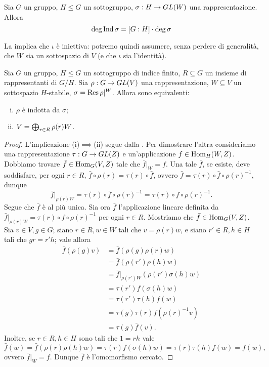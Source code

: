 \begin{corollary}
Sia $G$ un gruppo, $H\le G$ un sottogruppo, $\sigma:H\to GL(W)$ una rappresentazione. Allora
$$
\deg\operatorname{Ind}\sigma=[G:H]\cdot\deg\sigma
$$
\end{corollary}

La  implica che $\iota$ è iniettiva: potremo quindi assumere, senza perdere di generalità, che $W$ sia un sottospazio di $V$ (e che $\iota$ sia l'identità).

\begin{proposition}
Sia $G$ un gruppo, $H\le G$ un sottogruppo di indice finito, $R\subseteq G$ un insieme di rappresentanti di $G/H$. Sia $\rho:G\to GL(V)$ una rappresentazione, $W\subseteq V$ un sottospazio $H$-stabile, $\sigma=\operatorname{Res}\rho|^W$. Allora sono equivalenti:
\begin{enumerate}[(i)]
\item $\rho$ è indotta da $\sigma$;
\item $V=\bigoplus_{r\in R}\rho(r)W$.
\end{enumerate}
\end{proposition}
\begin{proof}
L'implicazione (i)$\implies$(ii) segue dalla . Per dimostrare l'altra consideriamo una rappresentazione $\tau:G\to GL(Z)$ e un'applicazione $f\in\operatorname{Hom}_H(W,Z)$. Dobbiamo trovare $\bar{f}\in\operatorname{Hom}_G(V,Z)$ tale che $\bar{f}|_W=f$. Una tale $\bar{f}$, se esiste, deve soddisfare, per ogni $r\in R$, $\bar{f}\circ\rho(r)=\tau(r)\circ\bar{f}$, ovvero $\bar{f}=\tau(r)\circ\bar{f}\circ\rho(r)^{-1}$, dunque 
$$
\bar{f}|_{\rho(r)W}=\tau(r)\circ\bar{f}\circ\rho(r)^{-1}=\tau(r)\circ f\circ\rho(r)^{-1}.
$$
Segue che $\bar{f}$ è al più unica. Sia ora $\bar{f}$ l'applicazione lineare definita da $\bar{f}|_{\rho(r)W}=\tau(r)\circ f\circ\rho(r)^{-1}$ per ogni $r\in R$. Mostriamo che $\bar{f}\in\operatorname{Hom}_G(V,Z)$. Sia $v\in V\comma g\in G$; siano $r\in R\comma w\in W$ tali che $v=\rho(r)w$, e siano $r'\in R\comma h\in H$ tali che $gr=r'h$; vale allora
\begin{align*}
\bar{f}(\rho(g)v)&=\bar{f}(\rho(g)\rho(r)w)\\
&=\bar{f}(\rho(r')\rho(h)w)\\
&=\bar{f}|_{\rho(r')W}(\rho(r')\sigma(h)w)\\
&=\tau(r')f(\sigma(h)w)\\
&=\tau(r')\tau(h)f(w)\\
&=\tau(g)\tau(r)f(\rho(r)^{-1}v)\\
&=\tau(g)\bar{f}(v).
\end{align*}
Inoltre, se $r\in R\comma h\in H$ sono tali che $1=rh$ vale
$$
\bar{f}(w)=\bar{f}(\rho(r)\rho(h)w)=\tau(r)f(\sigma(h)w)=\tau(r)\tau(h)f(w)=f(w),
$$
ovvero $\bar{f}|_W=f$. Dunque $\bar{f}$ è l'omomorfismo cercato.
\end{proof}


